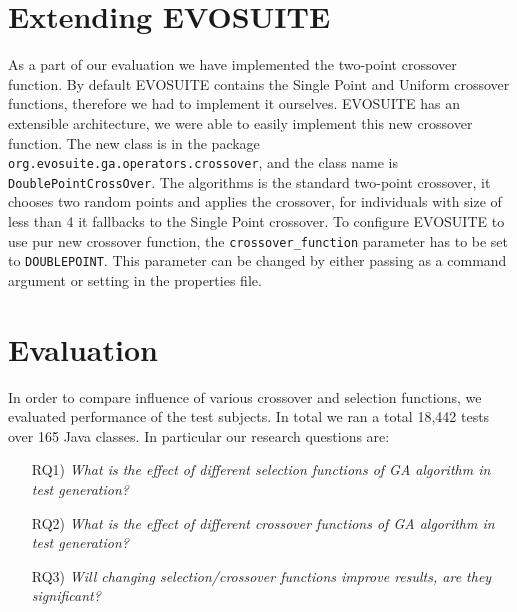 \documentclass[sigconf]{acmart}
\begin{document}
\section{Extending EVOSUITE}
\label{estending}
As a part of our evaluation we have implemented the two-point crossover function. By default EVOSUITE
contains the Single Point and Uniform crossover functions, therefore we had to implement it ourselves.
EVOSUITE has an extensible architecture, we were able to easily implement this new crossover function.
The new class is in the package \verb|org.evosuite.ga.operators.crossover|, and the class name is
\verb|DoublePointCrossOver|. The algorithms is the standard two-point crossover, it chooses two random 
points and applies the crossover, for individuals with size of less than 4 it fallbacks to 
the Single Point crossover. To configure EVOSUITE to use pur new crossover function, 
the \verb|crossover_function| parameter has to be set to \verb|DOUBLEPOINT|.
This parameter can be changed by either passing as a command argument or setting in the properties file.

\section{Evaluation}
\label{evaluation}
In order to compare influence of various crossover and selection functions, we evaluated performance of 
the test subjects. In total we ran a total 18,442 tests over 165 Java classes. In particular our 
research questions are:
\begin{itemize}
  \item[RQ1)] \textit{What is the effect of different selection functions of GA algorithm in test generation?}
  \item[RQ2)] \textit{What is the effect of different crossover functions of GA algorithm in test generation?}
  \item[RQ3)] \textit{Will changing selection/crossover functions improve results, are they significant?}
\end{itemize}
\end{document}
